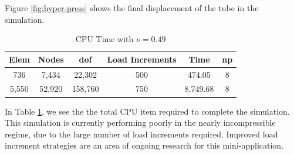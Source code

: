 Figure \ref{fig:hyper-press} shows the final displacement of the tube in the simulation.

\begin{table}[ht!]
\begin{center}
\begin{tabular}{c c c c c c} 
 \toprule
 Elem & Nodes & dof & Load Increments & Time & np \\ [0.5ex] 
 \midrule
736   &  7,434 &  22,302 & 500  &  474.05   & 8\\ 
5,550 & 52,920 & 158,760 & 750  &  8,749.68 & 8\\
 \bottomrule
\end{tabular}
\end{center}
\caption{CPU Time with $\nu = 0.49$}
 \label{table:hyper-meshSizes}
\end{table}

In Table \ref{table:hyper-meshSizes}, we see the the total CPU item required to complete the simulation.
This simulation is currently performing poorly in the nearly incompressible regime, due to the large number of load increments required.
Improved load increment strategies are an area of ongoing research for this mini-application.